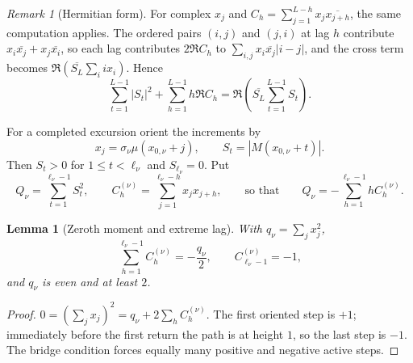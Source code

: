 \documentclass[11pt,reqno]{amsart}
\numberwithin{equation}{section}
\theoremstyle{plain}
\newtheorem{lemma}[theorem]{Lemma}
\theoremstyle{definition}
\theoremstyle{remark}
\newtheorem{remark}[theorem]{Remark}
\begin{document}
\begin{remark}[Hermitian form]
\label{rem:hermitian}
For complex $x_j$ and $C_h=\sum_{j=1}^{L-h}x_j\overline{x_{j+h}}$, the same
computation applies. The ordered pairs $(i,j)$ and $(j,i)$ at lag $h$
contribute $x_i\overline{x_j}+x_j\overline{x_i}$, so each lag contributes
$2\Re C_h$ to $\sum_{i,j}x_i\overline{x_j}|i-j|$, and the cross term
becomes $\Re(\overline{S_L}\sum_i ix_i)$. Hence
\begin{equation}
\sum_{t=1}^{L-1}|S_t|^2+\sum_{h=1}^{L-1}h\Re C_h
=\Re\!\left(\overline{S_L}\sum_{t=1}^{L-1}S_t\right).
\end{equation}
\end{remark}

For a completed excursion orient the increments by
\begin{equation}
\label{eq:orientation}
x_j=\sigma_\nu\mu(x_{0,\nu}+j),\qquad
S_t=|M(x_{0,\nu}+t)|.
\end{equation}
Then $S_t>0$ for $1\le t<\ell_\nu$ and $S_{\ell_\nu}=0$. Put
\begin{equation}
\label{eq:Q_def}
Q_\nu=\sum_{t=1}^{\ell_\nu-1}S_t^2,\qquad
C_h^{(\nu)}=\sum_{j=1}^{\ell_\nu-h}x_jx_{j+h},
\qquad\text{so that}\qquad
Q_\nu=-\sum_{h=1}^{\ell_\nu-1}hC_h^{(\nu)}.
\end{equation}

\begin{lemma}[Zeroth moment and extreme lag]
\label{lem:zeroth-corr}
With $q_\nu=\sum_jx_j^2$,
\begin{equation}
\label{eq:zeroth-corr}
\sum_{h=1}^{\ell_\nu-1}C_h^{(\nu)}=-\frac{q_\nu}{2},\qquad
C_{\ell_\nu-1}^{(\nu)}=-1,
\end{equation}
and $q_\nu$ is even and at least $2$.
\end{lemma}

\begin{proof}
$0=(\sum_jx_j)^2=q_\nu+2\sum_hC_h^{(\nu)}$. The first oriented step is $+1$;
immediately before the first return the path is at height $1$, so the last
step is $-1$. The bridge condition forces equally many positive and negative
active steps.
\end{proof}
\end{document}
